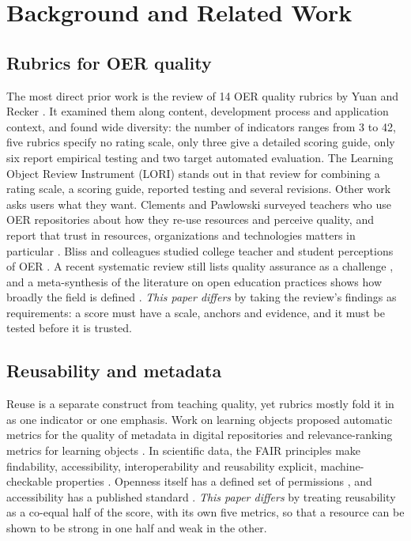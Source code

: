 \section{Background and Related Work}
\label{sec:related}

\subsection{Rubrics for OER quality}
The most direct prior work is the review of 14 OER quality rubrics by Yuan and Recker \cite{yuan2015}. It examined them along content, development process and application context, and found wide diversity: the number of indicators ranges from 3 to 42, five rubrics specify no rating scale, only three give a detailed scoring guide, only six report empirical testing and two target automated evaluation. The Learning Object Review Instrument (LORI) stands out in that review for combining a rating scale, a scoring guide, reported testing and several revisions. Other work asks users what they want. Clements and Pawlowski surveyed teachers who use OER repositories about how they re-use resources and perceive quality, and report that trust in resources, organizations and technologies matters in particular \cite{clements2012}. Bliss and colleagues studied college teacher and student perceptions of OER \cite{bliss2013}. A recent systematic review still lists quality assurance as a challenge \cite{adil2022}, and a meta-synthesis of the literature on open education practices shows how broadly the field is defined \cite{shareefa2023}. \emph{This paper differs} by taking the review's findings as requirements: a score must have a scale, anchors and evidence, and it must be tested before it is trusted.

\subsection{Reusability and metadata}
Reuse is a separate construct from teaching quality, yet rubrics mostly fold it in as one indicator or one emphasis. Work on learning objects proposed automatic metrics for the quality of metadata in digital repositories \cite{ochoa2009} and relevance-ranking metrics for learning objects \cite{ochoa2008}. In scientific data, the FAIR principles make findability, accessibility, interoperability and reusability explicit, machine-checkable properties \cite{wilkinson2016}. Openness itself has a defined set of permissions \cite{wiley5r,wiley2018}, and accessibility has a published standard \cite{wcag21}. \emph{This paper differs} by treating reusability as a co-equal half of the score, with its own five metrics, so that a resource can be shown to be strong in one half and weak in the other.

